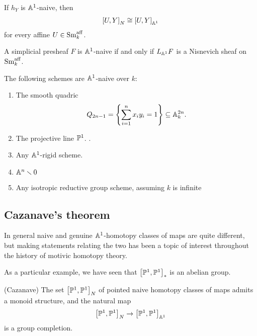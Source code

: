 \documentclass[11pt,openany]{book}
\providecommand{\aff}{\mathrm{aff}}
\begin{document}
\begin{proposition} If $h_Y$ is $\A^1$-naive, then
\begin{align*}
    \left[ U,Y \right]_N \cong \left[ U,Y \right]_{\A^1}
\end{align*}
for every affine $U \in \Sm_k^\aff$.
\end{proposition}




\begin{proposition} \cite[2.1.3]{AHW2}
A simplicial presheaf $F$ is $\A^1$-naive if and only if $L_{\A^1} F$ is a Nisnevich sheaf on $\Sm_k^\aff$.
\end{proposition}

\begin{example} The following schemes are $\A^1$-naive over $k$:
\begin{enumerate}
    \item The smooth quadric \cite[4.2.1]{AHW2}
    \begin{align*}
        Q_{2n-1} = \left\{ \sum_{i=1}^n x_i y_i =1 \right\} \subseteq \A_k^{2n}.
    \end{align*}
    
    \item The projective line $\P^1$. \cite[127]{BHQW}.

    \item Any $\A^1$-rigid scheme.

    \item $\A^n \minus 0$ \cite[4.2.6]{AHW2}

    \item Any isotropic reductive group scheme, assuming $k$ is infinite \cite[4.3.1]{AHW2}
\end{enumerate}
\end{example}



\subsection{Cazanave's theorem}

In general naive and genuine $\A^1$-homotopy classes of maps are quite different, but making statements relating the two has been a topic of interest throughout the history of motivic homotopy theory.

As a particular example, we have seen that $\left[ \P^1,\P^1 \right]_\ast$ is an abelian group. 

\begin{theorem} (Cazanave) The set $\left[ \P^1,\P^1 \right]_N$ of pointed naive homotopy classes of maps admits a monoid structure, and the natural map
\begin{align*}
    \left[ \P^1,\P^1 \right]_N \to \left[ \P^1,\P^1 \right]_{\A^1}
\end{align*}
is a group completion.
\end{theorem}
\end{document}
